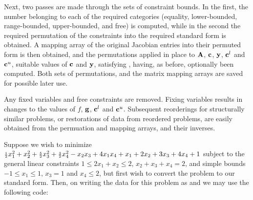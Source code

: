 \documentclass{galahad}
\begin{document}
Next, two passes are made through the sets of constraint bounds.
In the first, the number belonging to each of the required categories
(equality, lower-bounded, range-bounded,
upper-bounded, and free) is computed, while in the
second the required permutation of the constraints
into the required standard form is obtained.
A mapping array of the original Jacobian entries into their
permuted form is then obtained, and the permutations applied in place
to ${\mathbf{A}}$, ${\mathbf{c}}$, ${\mathbf{y}}$, ${\mathbf{c}}^l$ and ${\mathbf{c}}^u$,
suitable values of ${\mathbf{c}}$ and ${\mathbf{y}}$, satisfying ,
having, as before, optionally been computed.
Both sets of permutations, and the matrix mapping arrays are saved for
possible later use.

Any fixed variables and free constraints are removed. Fixing variables
results in changes to the values of $f$, ${\mathbf{g}}$, ${\mathbf{c}}^l$ and ${\mathbf{c}}^u$.
Subsequent reorderings for structurally similar problems, or restorations
of data from reordered problems,
are easily obtained from the permuation and mapping arrays, and their inverses.


\galexample
Suppose we wish to minimize
${\scriptstyle \frac{1}{2}} x_1^2 + x_2^2 + {\scriptstyle \frac{5}{2}} x_3^2 +
{\scriptstyle \frac{3}{2}} x_4^2 - x_2 x_3 + 4 x_1 x_4
 + x_1 + 2 x_2 + 3 x_3 + 4 x_4 + 1$
subject to the general linear constraints
$1 \leq 2 x_1 + x_2 \leq 2$,
$x_2 + x_3 + x_4 = 2$, and simple bounds
$-1 \leq x_1 \leq 1$, $x_3 = 1$ and $x_4 \leq 2$, but first wish to
convert the problem to our standard form.
Then, on writing the data for this problem as
and
we may use the following code:
\end{document}
